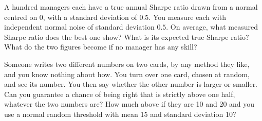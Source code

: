 \begin{question}\label{iq:iv1:conditional-probability-and-bayes:39}
A hundred managers each have a true annual Sharpe ratio drawn from a normal centred on 0, with a standard deviation of $0.5$. You measure each with independent normal noise of standard deviation $0.5$. On average, what measured Sharpe ratio does the best one show? What is its expected true Sharpe ratio? What do the two figures become if no manager has any skill?
\end{question}

\begin{question}\label{iq:iv1:conditional-probability-and-bayes:40}
Someone writes two different numbers on two cards, by any method they like, and you know nothing about how. You turn over one card, chosen at random, and see its number. You then say whether the other number is larger or smaller. Can you guarantee a chance of being right that is strictly above one half, whatever the two numbers are? How much above if they are 10 and 20 and you use a normal random threshold with mean 15 and standard deviation 10?
\end{question}
